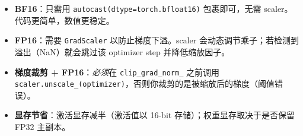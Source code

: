 \begin{intuitionbox}
\begin{itemize}
  \item \textbf{BF16}：只需用 \texttt{autocast(dtype=torch.bfloat16)} 包裹即可，无需 scaler。代码更简单，数值更稳定。
  \item \textbf{FP16}：需要 \texttt{GradScaler} 以防止梯度下溢。scaler 会动态调节乘子；若检测到溢出（NaN）就会跳过该 optimizer step 并降低缩放因子。
  \item \textbf{梯度裁剪 + FP16}：\emph{必须}在 \texttt{clip\_grad\_norm\_} 之前调用 \texttt{scaler.unscale\_(optimizer)}，否则你裁剪的是被缩放后的梯度（阈值错误）。
  \item \textbf{显存节省}：激活显存减半（激活值以 16-bit 存储）；权重显存取决于是否保留 FP32 主副本。
\end{itemize}
\end{intuitionbox}

